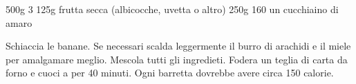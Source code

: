 \begin{ingreds}
	500g 
	3 
	125g frutta secca (albicocche, uvetta o altro)
	250g 
	160 
	un cucchiaino di  amaro

\end{ingreds}

\begin{method}
	Schiaccia le banane. Se necessari scalda leggermente il burro di arachidi e il miele per amalgamare meglio. Mescola tutti gli ingredieti. Fodera un teglia di carta da forno e cuoci a  per 40 minuti. Ogni barretta dovrebbe avere circa 150 calorie.
\end{method}



